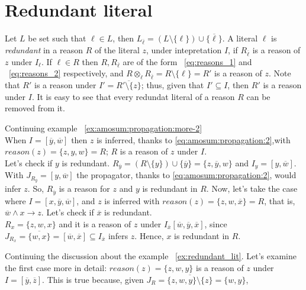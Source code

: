 \section{Redundant literal}
\label{sec:redundant_literal}
Let $L$ be set such that $\ell \in L$,
then $L_{\overline{\ell}} = (L \setminus \{\ell\}) \cup \{\overline{\ell}\}$.
A literal $\ell$ is \textit{redundant} in a reason $R$ of the literal $z$, under intepretation $I$, 
if $R_{\overline{\ell}}$ is a reason of $z$ under $I_{\ell}$.
If $\ell \in R$ then  $R,R_{\overline{\ell}}$ are of the form ~\ref{eq:reasons_1} and 
~\ref{eq:reasons_2} respectively,
and $R \otimes_{\ell} R_{\overline{\ell}} = R \setminus \{\ell\} = R'$ is a reason of $z$.
Note that $R'$ is a reason under  $I' = \overline{R' \setminus \{z\}}$; 
thus, given that $I' \subseteq I$, then $R'$ is a reason under $I$.
It is easy to see that every redundat literal of a reason $R$ can be removed from it.
\begin{example}{Continuing example ~\ref{ex:amosum:propagation:more-2}}\\
    \label{ex:redundant_lit}
    When $I = [\overline{y}, \overline{w}]$ then $z$ is inferred,
    thanks to \eqref{eq:amosum:propagation:2},with $\mathit{reason}(z) = \{z,y,w\} = R$;
    $R$ is a reason of $z$ under $I$.\\
    Let's check if $y$ is redundant.
    $R_{\overline{y}} = (R \setminus \{y\}) \cup \{\overline{y}\} = \{z,\overline{y},w\}$ and $I_{y} = [y,\overline{w}]$.
    With $J_{R_{\overline{y}}} = [y,\overline{w}]$ the propagator, thanks to \eqref{eq:amosum:propagation:2}, 
    would infer $z$.
    So, $R_{\overline{y}}$ is a reason for $z$
    and $y$ is redundant in $R$.
    Now, let's take the case where $I = [x, \overline{y}, \overline{w}]$, 
    and $z$ is inferred with $\mathit{reason}(z) = \{z, w, \overline{x}\} = R$, that is, 
    $\overline{w} \land  x \rightarrow z$.
    Let's check if $\overline{x}$ is redundant.\\
    $R_{x} = \{z, w, x\}$ and it is a reason of $z$ under $I_{\overline{x}}[\overline{w}, \overline{y},\overline{x}]$, 
    since $J_{R_x} = \overline{\{w, x\}} = [\overline{w},\overline{x}] \subseteq I_{\overline{x}}$
    infers $z$. Hence, $x$ is redundant in $R$.
\end{example}
Continuing the discussion about the example ~\ref{ex:redundant_lit}.
Let's examine the first case more in detail: $\mathit{reason}(z) = \{z, w, y\}$ is a 
reason of $z$ under $I = [\overline{y}, \overline{z}]$. This is true because,
given $J_R = \overline{\{z, w, y\} \setminus \{z\}} = \{w,y\} $,
